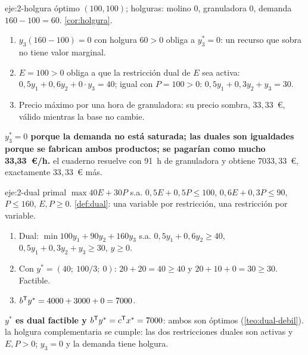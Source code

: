 \begin{solucion}{eje:2-holgura}
\datos óptimo $(100,100)$; holguras: molino 0, granuladora 0, demanda $160-100=60$.
\planteamiento \cref{cor:holgura}.
\pasos
\begin{enumerate}[label=\arabic*.]
  \item $y_3(160-100)=0$ con holgura $60>0$ obliga a $y_3^{*}=0$: un recurso que sobra no tiene valor marginal.
  \item $E=100>0$ obliga a que la restricción dual de $E$ sea activa: $0{,}5y_1+0{,}6y_2+0\cdot y_3=40$; igual con $P=100>0$: $0{,}5y_1+0{,}3y_2+y_3=30$.
  \item Precio máximo por una hora de granuladora: su precio sombra, $33{,}33$~€, válido mientras la base no cambie.
\end{enumerate}
\resultado \textbf{$y_3^{*}=0$ porque la demanda no está saturada; las duales son igualdades porque se fabrican ambos productos; se pagarían como mucho 33,33~€/h.}
\comprobacion el cuaderno resuelve con 91~h de granuladora y obtiene $7033{,}33$~€, exactamente $33{,}33$~€ más.
\end{solucion}

\begin{solucion}{eje:2-dual}
\datos primal $\max 40E+30P$ s.a. $0{,}5E+0{,}5P\le 100$, $0{,}6E+0{,}3P\le 90$, $P\le 160$, $E,P\ge 0$.
\planteamiento \cref{def:dual}: una variable por restricción, una restricción por variable.
\pasos
\begin{enumerate}[label=\arabic*.]
  \item Dual: $\min 100y_1+90y_2+160y_3$ s.a. $0{,}5y_1+0{,}6y_2\ge 40$, $0{,}5y_1+0{,}3y_2+y_3\ge 30$, $y\ge 0$.
  \item Con $y^{*}=(40;\ 100/3;\ 0)$: $20+20=40\ge 40$ y $20+10+0=30\ge 30$. Factible.
  \item $b^{\mathsf{T}} y^{*}=4000+3000+0=7000$.
\end{enumerate}
\resultado \textbf{$y^{*}$ es dual factible y $b^{\mathsf{T}} y^{*}=c^{\mathsf{T}} x^{*}=7000$}: ambos son óptimos (\cref{teo:dual-debil}).
\comprobacion la holgura complementaria se cumple: las dos restricciones duales son activas y $E,P>0$; $y_3=0$ y la demanda tiene holgura.
\end{solucion}

